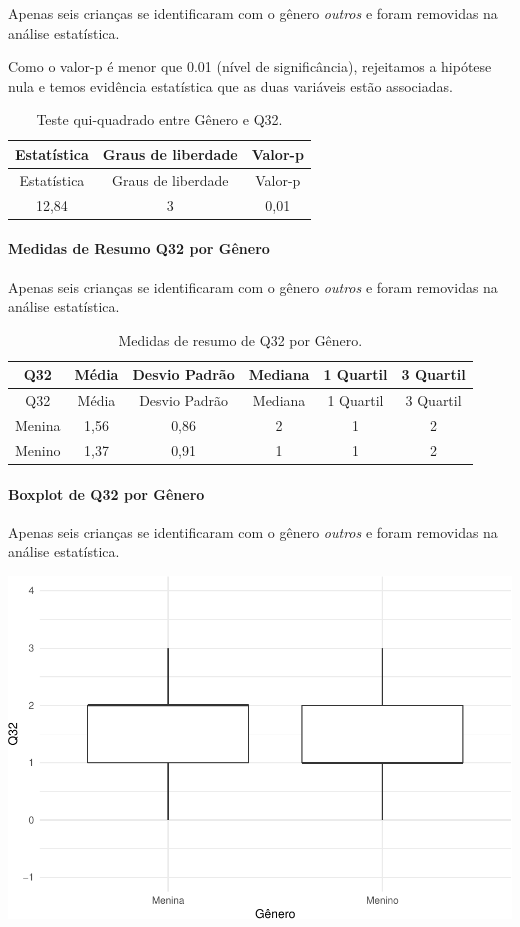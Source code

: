 \documentclass[]{article}
\let\oldparagraph\paragraph
\renewcommand{\paragraph}[1]{\oldparagraph{#1}\mbox{}}
\begin{document}
Apenas seis crianças se identificaram com o gênero \emph{outros} e foram removidas na análise estatística.

Como o valor-p é menor que 0.01 (nível de significância), rejeitamos a hipótese nula e temos evidência estatística que as duas variáveis estão associadas.

\begin{longtable}[]{@{}ccc@{}}
\caption{\label{tab:unnamed-chunk-1087}Teste qui-quadrado entre Gênero e Q32.}\tabularnewline
\toprule
Estatística & Graus de liberdade & Valor-p\tabularnewline
\midrule
\endfirsthead
\toprule
Estatística & Graus de liberdade & Valor-p\tabularnewline
\midrule
\endhead
12,84 & 3 & 0,01\tabularnewline
\bottomrule
\end{longtable}

\cleardoublepage

\hypertarget{medidas-de-resumo-q32-por-guxeanero}{%
\paragraph{Medidas de Resumo Q32 por Gênero}\label{medidas-de-resumo-q32-por-guxeanero}}

Apenas seis crianças se identificaram com o gênero \emph{outros} e foram removidas na análise estatística.

\begin{longtable}[]{@{}cccccc@{}}
\caption{\label{tab:unnamed-chunk-1088}Medidas de resumo de Q32 por Gênero.}\tabularnewline
\toprule
Q32 & Média & Desvio Padrão & Mediana & 1 Quartil & 3 Quartil\tabularnewline
\midrule
\endfirsthead
\toprule
Q32 & Média & Desvio Padrão & Mediana & 1 Quartil & 3 Quartil\tabularnewline
\midrule
\endhead
Menina & 1,56 & 0,86 & 2 & 1 & 2\tabularnewline
Menino & 1,37 & 0,91 & 1 & 1 & 2\tabularnewline
\bottomrule
\end{longtable}

\hypertarget{boxplot-de-q32-por-guxeanero}{%
\paragraph{Boxplot de Q32 por Gênero}\label{boxplot-de-q32-por-guxeanero}}

Apenas seis crianças se identificaram com o gênero \emph{outros} e foram removidas na análise estatística.

\begin{center}\includegraphics[width=0.75\linewidth]{relatorio_covid19_files/figure-latex/unnamed-chunk-1089-1} \end{center}
\end{document}
